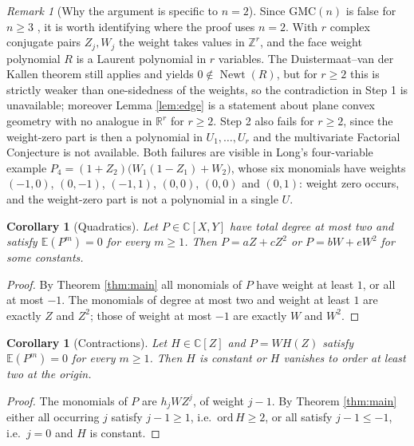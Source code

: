 \documentclass[11pt]{amsart}
\theoremstyle{plain}
\newtheorem{corollary}[theorem]{Corollary}
\theoremstyle{remark}
\newtheorem{remark}[theorem]{Remark}
\numberwithin{equation}{section}
\DeclareMathOperator{\Newt}{Newt}
\newcommand{\C}{\mathbb{C}}
\newcommand{\Z}{\mathbb{Z}}
\newcommand{\E}{\mathbb{E}}
\newcommand{\GMC}{\mathrm{GMC}}
\begin{document}
\begin{remark}[Why the argument is specific to $n=2$]\label{rem:scope}
Since $\GMC(n)$ is false for $n\ge3$ \cite{Long}, it is worth identifying where
the proof uses $n=2$. With $r$ complex conjugate pairs $Z_j,W_j$ the weight
takes values in $\Z^r$, and the face weight polynomial $R$ is a Laurent
polynomial in $r$ variables. The Duistermaat--van der Kallen theorem still
applies and yields $0\notin\Newt(R)$, but for $r\ge2$ this is strictly weaker
than one-sidedness of the weights, so the contradiction in Step 1 is
unavailable; moreover Lemma \ref{lem:edge} is a statement about plane convex
geometry with no analogue in $\mathbb R^{r}$ for $r\ge2$. Step 2 also fails for
$r\ge2$, since the weight-zero part is then a polynomial in $U_1,\dots,U_r$ and
the multivariate Factorial Conjecture is not available. Both failures are
visible in Long's four-variable example
$P_4=(1+Z_2)\bigl(W_1(1-Z_1)+W_2\bigr)$, whose six monomials have weights
$(-1,0)$, $(0,-1)$, $(-1,1)$, $(0,0)$, $(0,0)$ and $(0,1)$: weight zero occurs,
and the weight-zero part is not a polynomial in a single $U$.
\end{remark}

\begin{corollary}[Quadratics]\label{cor:quadratic}
Let $P\in\C[X,Y]$ have total degree at most two and satisfy $\E(P^m)=0$ for
every $m\ge1$. Then $P=aZ+cZ^2$ or $P=bW+eW^2$ for some constants.
\end{corollary}

\begin{proof}
By Theorem \ref{thm:main} all monomials of $P$ have weight at least $1$, or all
at most $-1$. The monomials of degree at most two and weight at least $1$ are
exactly $Z$ and $Z^2$; those of weight at most $-1$ are exactly $W$ and $W^2$.
\end{proof}

\begin{corollary}[Contractions]\label{cor:contraction}
Let $H\in\C[Z]$ and $P=WH(Z)$ satisfy $\E(P^m)=0$ for every $m\ge1$. Then $H$ is
constant or $H$ vanishes to order at least two at the origin.
\end{corollary}

\begin{proof}
The monomials of $P$ are $h_jWZ^j$, of weight $j-1$. By Theorem \ref{thm:main}
either all occurring $j$ satisfy $j-1\ge1$, i.e.\ $\mathrm{ord}\,H\ge2$, or all
satisfy $j-1\le-1$, i.e.\ $j=0$ and $H$ is constant.
\end{proof}
\end{document}

